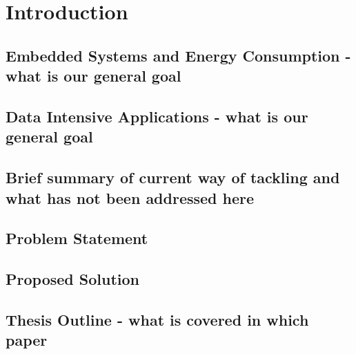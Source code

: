 \chapter{Introduction}
\label{intro}


\section{Embedded Systems and Energy Consumption - what is our general goal}

\section{Data Intensive Applications - what is our general goal}

\section{Brief summary of current way of tackling and what has not been addressed here}

\section{Problem Statement}

\section{Proposed Solution}

\section{Thesis Outline - what is covered in which paper}